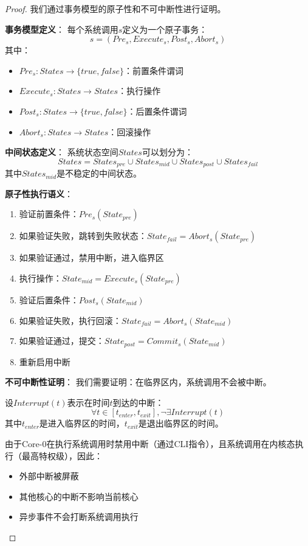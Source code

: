 \documentclass{article}
\theoremstyle{definition}
\theoremstyle{remark}
\begin{document}
\begin{proof}
    我们通过事务模型的原子性和不可中断性进行证明。

    \textbf{事务模型定义}：
    每个系统调用$s$定义为一个原子事务：
    \[
    s = (Pre_s, Execute_s, Post_s, Abort_s)
    \]
    其中：
    \begin{itemize}
        \item $Pre_s: States \to \{true, false\}$：前置条件谓词
        \item $Execute_s: States \to States$：执行操作
        \item $Post_s: States \to \{true, false\}$：后置条件谓词
        \item $Abort_s: States \to States$：回滚操作
    \end{itemize}

    \textbf{中间状态定义}：
    系统状态空间$States$可以划分为：
    \[
    States = States_{pre} \cup States_{mid} \cup States_{post} \cup States_{fail}
    \]
    其中$States_{mid}$是不稳定的中间状态。

    \textbf{原子性执行语义}：
    \begin{enumerate}
        \item 验证前置条件：$Pre_s(State_{pre})$
        \item 如果验证失败，跳转到失败状态：$State_{fail} = Abort_s(State_{pre})$
        \item 如果验证通过，禁用中断，进入临界区
        \item 执行操作：$State_{mid} = Execute_s(State_{pre})$
        \item 验证后置条件：$Post_s(State_{mid})$
        \item 如果验证失败，执行回滚：$State_{fail} = Abort_s(State_{mid})$
        \item 如果验证通过，提交：$State_{post} = Commit_s(State_{mid})$
        \item 重新启用中断
    \end{enumerate}

    \textbf{不可中断性证明}：
    我们需要证明：在临界区内，系统调用不会被中断。

    设$Interrupt(t)$表示在时间$t$到达的中断：
    \[
    \forall t \in [t_{enter}, t_{exit}], \neg \exists Interrupt(t)
    \]
    其中$t_{enter}$是进入临界区的时间，$t_{exit}$是退出临界区的时间。

    由于Core-0在执行系统调用时禁用中断（通过CLI指令），且系统调用在内核态执行（最高特权级），因此：
    \begin{itemize}
        \item 外部中断被屏蔽
        \item 其他核心的中断不影响当前核心
        \item 异步事件不会打断系统调用执行
    \end{itemize}


\end{proof}
\end{document}
